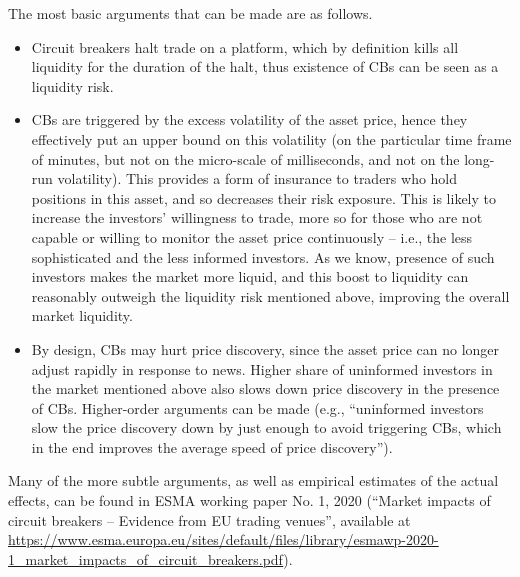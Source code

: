 \begin{solution}
	The most basic arguments that can be made are as follows.
	\begin{itemize}
		\item Circuit breakers halt trade on a platform, which by definition kills all liquidity for the duration of the halt, thus existence of CBs can be seen as a liquidity risk.
		
		\item CBs are triggered by the excess volatility of the asset price, hence they effectively put an upper bound on this volatility (on the particular time frame of minutes, but not on the micro-scale of milliseconds, and not on the long-run volatility). This provides a form of insurance to traders who hold positions in this asset, and so decreases their risk exposure. This is likely to increase the investors' willingness to trade, more so for those who are not capable or willing to monitor the asset price continuously -- i.e., the less sophisticated and the less informed investors. As we know, presence of such investors makes the market more liquid, and this boost to liquidity can reasonably outweigh the liquidity risk mentioned above, improving the overall market liquidity.
		
		\item By design, CBs may hurt price discovery, since the asset price can no longer adjust rapidly in response to news. Higher share of uninformed investors in the market mentioned above also slows down price discovery in the presence of CBs. Higher-order arguments can be made (e.g., ``uninformed investors slow the price discovery down by just enough to avoid triggering CBs, which in the end improves the average speed of price discovery'').
	\end{itemize}
	
	Many of the more subtle arguments, as well as empirical estimates of the actual effects, can be found in ESMA working paper No. 1, 2020 (``Market impacts of circuit breakers – Evidence from EU trading venues'', available at \url{https://www.esma.europa.eu/sites/default/files/library/esmawp-2020-1_market_impacts_of_circuit_breakers.pdf}).
\end{solution}

\fi
